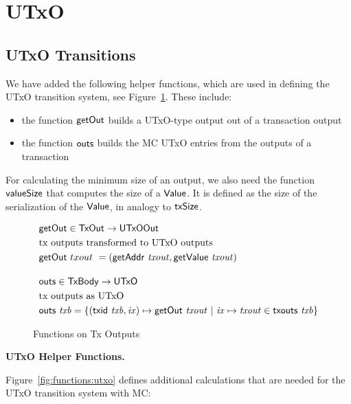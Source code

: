 \section{UTxO}
\label{sec:utxo}


\subsection{UTxO Transitions}
\label{sec:utxo-trans}

We have added the following helper functions, which are used in defining the
UTxO transition system, see Figure~\ref{fig:functions:insouts}. These include:

\begin{itemize}
  \item the function $\mathsf{getOut}$ builds a UTxO-type output out of a
  transaction output
  \item the function $\mathsf{outs}$ builds the MC UTxO entries from the outputs
  of a transaction
\end{itemize}

For calculating the minimum size of an output, we also need the
function $\mathsf{valueSize}$ that computes the size of a $\mathsf{Value}$. It is
defined as the size of the serialization of the $\mathsf{Value}$, in analogy
to $\mathsf{txSize}$.

\begin{figure}[htb]
  \begin{align*}
    & \fun{getOut} \in \TxOut \to \UTxOOut \\
    & \text{tx outputs transformed to UTxO outputs} \\
    & \fun{getOut} ~{txout}~= (\fun{getAddr}~\var{txout}, \fun{getValue}~\var{txout})
    \nextdef
    & \fun{outs} \in \TxBody \to \UTxO \\
    & \text{tx outputs as UTxO} \\
    & \fun{outs} ~\var{txb} =
        \left\{
          (\fun{txid} ~ \var{txb}, \var{ix}) \mapsto \fun{getOut}~\var{txout} ~
          \middle|~
          \var{ix} \mapsto \var{txout} \in \txouts{txb}
        \right\} \\
  \end{align*}
  \caption{Functions on Tx Outputs}
  \label{fig:functions:insouts}
\end{figure}

\textbf{UTxO Helper Functions.}

Figure~\ref{fig:functions:utxo} defines additional calculations that are needed for the
UTxO transition system with MC:

